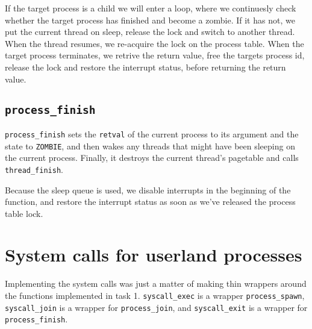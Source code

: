 \documentclass{article}
\begin{document}
If the target process is a child we will enter a loop, where we
continuesly check whether the target process has finished and become a
zombie. If it has not, we put the current thread on sleep,
release the lock and switch to another thread. When the thread resumes,
we re-acquire the lock on the process table. When the
target process terminates, we retrive the return value, free the
targets process id, release
the lock and restore the interrupt status, before returning
the return value.

\subsection{\texttt{process\_finish}}

\texttt{process\_finish} sets the \texttt{retval} of the current process to its argument and the state to \texttt{ZOMBIE}, and then wakes any threads that might have been sleeping on the current process. Finally, it destroys the current thread's pagetable and calls \texttt{thread\_finish}.

Because the sleep queue is used, we disable interrupts in the beginning of the function, and restore the interrupt status as soon as we've released the process table lock.

\section{System calls for userland processes}
Implementing the system calls was just a matter of making thin wrappers around the functions implemented in task 1. \texttt{syscall\_exec} is a wrapper \texttt{process\_spawn}, \texttt{syscall\_join} is a wrapper for \texttt{process\_join}, and \texttt{syscall\_exit} is a wrapper for \texttt{process\_finish}.
\end{document}
